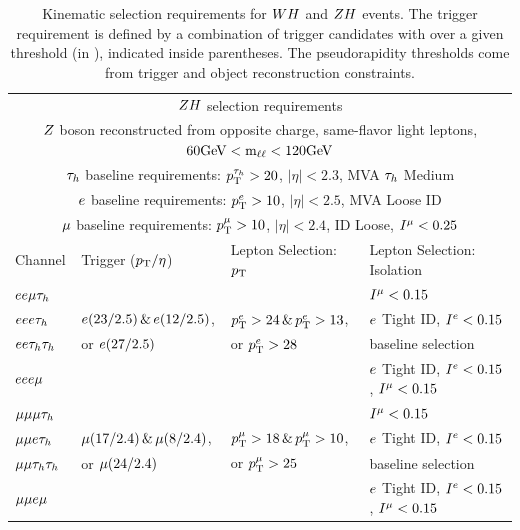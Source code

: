 \begin{table}[htbp]
\begin{small}
\begin{tabular}{llll}
\\
     \multicolumn{4}{c}{$ZH$ selection requirements}                 \\ 
     \multicolumn{4}{c}{$Z$ boson reconstructed from opposite charge, same-flavor light leptons, $60\mathrm{GeV} < \textrm{m}_{\ell\ell} < 120\mathrm{GeV}$}  \\ 
     \multicolumn{4}{c}{$\tau_{h}$ baseline requirements: $p_\mathrm{T}^{\tau_{h}}>20$, $|\eta|<2.3$, MVA $\tau_{h}$ Medium}   \\ 
     \multicolumn{4}{c}{$e$ baseline requirements: $p_\mathrm{T}^{e}>10$, $|\eta|<2.5$, MVA Loose ID }   \\ 
     \multicolumn{4}{c}{$\mu$ baseline requirements: $p_\mathrm{T}^{\mu}>10$, $|\eta|<2.4$, ID Loose, $I^{\mu}<0.25$ }   \\ 
\hline
  Channel           &         Trigger ($p_\mathrm{T}/\eta$)         & Lepton Selection: $p_\mathrm{T}$   & Lepton Selection: Isolation  \\
\hline
  $ee\mu\tau_{h}$     &                                    &                                    &  $I^{\mu}<0.15$       \\
  $eee\tau_{h}$      & $e(23/2.5)\,\&\,e(12/2.5)$,    &  $p_\mathrm{T}^{e}>24\,\&\,p_\mathrm{T}^{e}>13$, &  $e$ Tight ID, $I^{e}<0.15$ \\
  $ee\tau_{h}\tau_{h}$    & or $e(27/2.5)$                   &  or $p_\mathrm{T}^{e}>28$                   &  baseline selection       \\
  $eee\mu$       &                                    &                                    &  $e$ Tight ID, $I^{e}<0.15$, $I^{\mu}<0.15$ \\
\hline
  $\mu\mu\mu\tau_{h}$   &                                    &                                    &  $I^{\mu}<0.15$       \\
  $\mu\mu e\tau_{h}$    &  $\mu(17/2.4)\,\&\,\mu(8/2.4)$,  &  $p_\mathrm{T}^{\mu}>18\,\&\,p_\mathrm{T}^{\mu}>10$,   &  $e$ Tight ID, $I^{e}<0.15$ \\
  $\mu\mu\tau_{h}\tau_{h}$  &   or $\mu(24/2.4)$                &  or $p_\mathrm{T}^{\mu}>25$                  &  baseline selection       \\
  $\mu\mu e\mu$     &                                    &                                    &  $e$ Tight ID, $I^{e}<0.15$, $I^{\mu}<0.15$ \\
\hline
\end{tabular}
\end{small}
\caption{Kinematic selection requirements for $WH$ and $ZH$ events.
The trigger requirement is defined by a combination of trigger candidates with 
\pt over a given threshold (in \GeV), indicated inside parentheses. The 
pseudorapidity thresholds come from trigger and object reconstruction constraints.
\label{tab:inclusive_selection}
}
\end{table}

